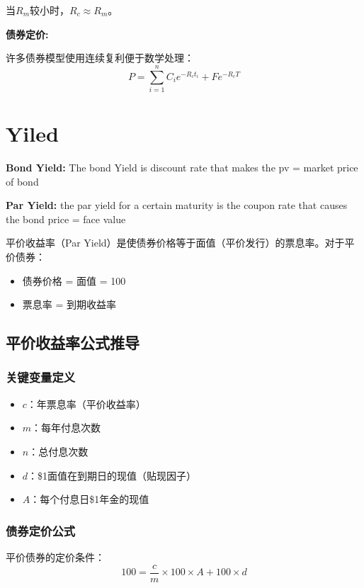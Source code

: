 当$R_m$较小时，$R_c \approx R_m$。


\textbf{ 债券定价:}

许多债券模型使用连续复利便于数学处理：
\begin{equation}
P = \sum_{i=1}^{n} C_i e^{-R_c t_i} + F e^{-R_c T}
\end{equation}

\section{Yiled}

\textbf{Bond Yield:}
The bond Yield is discount rate that makes the pv  = market price of bond

\textbf{Par Yield:}
the par yield for a certain maturity is the coupon rate that causes the bond price  =  face value


平价收益率（Par Yield）是使债券价格等于面值（平价发行）的票息率。对于平价债券：
\begin{itemize}
    \item 债券价格 = 面值 = 100
    \item 票息率 = 到期收益率
\end{itemize}

\subsection{平价收益率公式推导}

\subsubsection{关键变量定义}

\begin{itemize}
    \item $c$：年票息率（平价收益率）
    \item $m$：每年付息次数
    \item $n$：总付息次数
    \item $d$：\$1面值在到期日的现值（贴现因子）
    \item $A$：每个付息日\$1年金的现值
\end{itemize}

\subsubsection{债券定价公式}

平价债券的定价条件：
\begin{equation}
100 = \frac{c}{m} \times 100 \times A + 100 \times d
\end{equation}

